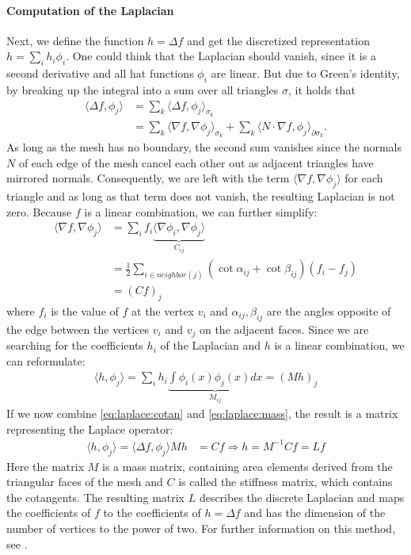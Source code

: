 \paragraph{Computation of the Laplacian}
Next, we define the function $h = \Delta f$ and get the discretized representation $h = \sum_i h_i \phi_i$.
One could think that the Laplacian should vanish, since it is a second derivative and all hat functions $\phi_i$ are linear.
But due to Green's identity, by breaking up the integral into a sum over all triangles $\sigma$, it holds that
\begin{align}
	\langle \Delta f, \phi_j \rangle &= \sum_{k} \langle \Delta f, \phi_j \rangle_{\sigma_k} \\
	&= \sum_{k} \langle \nabla f, \nabla \phi_j \rangle_{\sigma_k} + \sum_{k} \langle N \cdot \nabla f, \phi_j \rangle_{\partial \sigma_k}.
\end{align}
As long as the mesh has no boundary, the second sum vanishes since the normals $N$ of each edge of the mesh cancel each other out as adjacent triangles have mirrored normals.
Consequently, we are left with the term $\langle \nabla f, \nabla \phi_j \rangle$ for each triangle and as long as that term does not vanish, the resulting Laplacian is not zero.
Because $f$ is a linear combination, we can further simplify:
\begin{align}
	\langle \nabla f, \nabla \phi_j \rangle &= \sum_i f_i \underbrace{\langle \nabla \phi_i, \nabla \phi_j \rangle}_{C_{ij}} \\
	& = \frac{1}{2} \sum_{i \in neighbor(j)} (\cot \alpha_{ij} + \cot \beta_{ij})(f_i - f_j)\\
	& = (Cf)_j
	\label{eq:laplace:cotan}
\end{align}
where $f_i$ is the value of $f$ at the vertex $v_i$ and $\alpha_{ij},\beta_{ij}$ are the angles opposite of the edge between the vertices $v_i$ and $v_j$ on the adjacent faces.
Since we are searching for the coefficients $h_i$ of the Laplacian and $h$ is a linear combination, we can reformulate:
\begin{align}
	\langle h, \phi_j \rangle = \sum_i h_i \underbrace{\int \phi_i(x) \phi_j(x) dx}_{M_{ij}} = (Mh)_j
	\label{eq:laplace:mass}
\end{align}
If we now combine \eqref{eq:laplace:cotan} and \eqref{eq:laplace:mass}, the result is a matrix representing the Laplace operator:
\begin{align}
	\langle h, \phi_j \rangle = \langle \Delta f, \phi_j \rangle
	Mh &= Cf \Rightarrow h = M^{-1}Cf = Lf
	\label{eq:laplace:final}
\end{align}
Here the matrix $M$ is a mass matrix, containing area elements derived from the triangular faces of the mesh and $C$ is called the stiffness matrix, which contains the cotangents.
The resulting matrix $L$ describes the discrete Laplacian and maps the coefficients of $f$ to the coefficients of $h = \Delta f$ and has the dimension of the number of vertices to the power of two.
For further information on this method, see \cite{pinkall1993computing}.

